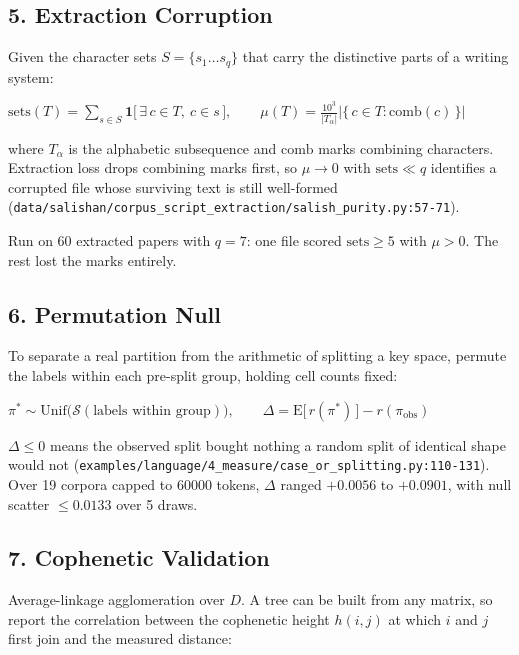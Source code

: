 \subsection{5. Extraction Corruption}

Given the character sets \(S = \{s_1 \dots s_q\}\) that carry the distinctive parts of a writing system:

\(\mathrm{sets}(T) = \sum_{s \in S} \mathbf{1}\bigl[\,\exists\, c \in T,\ c \in s\,\bigr], \qquad \mu(T) = \frac{10^3}{|T_\alpha|}\bigl|\{\,c \in T : \mathrm{comb}(c)\,\}\bigr|\)

where \(T_\alpha\) is the alphabetic subsequence and \(\mathrm{comb}\) marks combining characters. Extraction loss drops combining marks first, so \(\mu \to 0\) with \(\mathrm{sets} \ll q\) identifies a corrupted file whose surviving text is still well-formed (\texttt{data/\allowbreak{}salishan/\allowbreak{}corpus\_\allowbreak{}script\_\allowbreak{}extraction/\allowbreak{}salish\_\allowbreak{}purity.\allowbreak{}py:57-\allowbreak{}71}).

Run on 60 extracted papers with \(q=7\): one file scored \(\mathrm{sets} \ge 5\) with \(\mu > 0\). The rest lost the marks entirely.

\subsection{6. Permutation Null}

To separate a real partition from the arithmetic of splitting a key space, permute the labels within each pre-split group, holding cell counts fixed:

\(\pi^{\ast} \sim \mathrm{Unif}\bigl(\mathcal{S}(\text{labels within group})\bigr), \qquad \Delta = \mathrm{E}\bigl[\,r(\pi^{\ast})\,\bigr] - r(\pi_{\text{obs}})\)

\(\Delta \le 0\) means the observed split bought nothing a random split of identical shape would not (\texttt{examples/\allowbreak{}language/\allowbreak{}4\_\allowbreak{}measure/\allowbreak{}case\_\allowbreak{}or\_\allowbreak{}splitting.\allowbreak{}py:110-\allowbreak{}131}). Over 19 corpora capped to 60000 tokens, \(\Delta\) ranged \(+0.0056\) to \(+0.0901\), with null scatter \(\le 0.0133\) over 5 draws.

\subsection{7. Cophenetic Validation}

Average-linkage agglomeration over \(D\). A tree can be built from any matrix, so report the correlation between the cophenetic height \(h(i,j)\) at which \(i\) and \(j\) first join and the measured distance:


